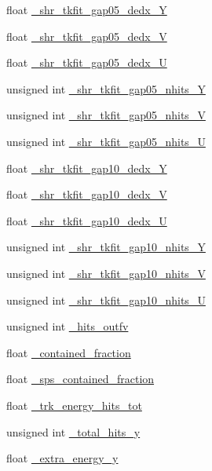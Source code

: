 \begin{DoxyCompactItemize}
\item 
float \hyperlink{classselection_1_1CC0piNpSelection_a82a0f0efca7cceee176b7058001073a6}{\+\_\+shr\+\_\+tkfit\+\_\+gap05\+\_\+dedx\+\_\+Y}
\item 
float \hyperlink{classselection_1_1CC0piNpSelection_a711b325a6f6cb77db530eb21e1c99fc0}{\+\_\+shr\+\_\+tkfit\+\_\+gap05\+\_\+dedx\+\_\+V}
\item 
float \hyperlink{classselection_1_1CC0piNpSelection_ad0504ef7cf7c8fa5a0059fbaedd6861b}{\+\_\+shr\+\_\+tkfit\+\_\+gap05\+\_\+dedx\+\_\+U}
\item 
unsigned int \hyperlink{classselection_1_1CC0piNpSelection_a91054bcbcb38dd0684fe810167c7146f}{\+\_\+shr\+\_\+tkfit\+\_\+gap05\+\_\+nhits\+\_\+Y}
\item 
unsigned int \hyperlink{classselection_1_1CC0piNpSelection_a515d1b21ecb57c0177501823b5ec2568}{\+\_\+shr\+\_\+tkfit\+\_\+gap05\+\_\+nhits\+\_\+V}
\item 
unsigned int \hyperlink{classselection_1_1CC0piNpSelection_a06b5781f09cf3c5129efad982fa3c210}{\+\_\+shr\+\_\+tkfit\+\_\+gap05\+\_\+nhits\+\_\+U}
\item 
float \hyperlink{classselection_1_1CC0piNpSelection_ae4ccdcc53f1b3e72cb360af8af316eb8}{\+\_\+shr\+\_\+tkfit\+\_\+gap10\+\_\+dedx\+\_\+Y}
\item 
float \hyperlink{classselection_1_1CC0piNpSelection_adf21374d01634ceeb71cdcb954c40b98}{\+\_\+shr\+\_\+tkfit\+\_\+gap10\+\_\+dedx\+\_\+V}
\item 
float \hyperlink{classselection_1_1CC0piNpSelection_a3b32a837b2388327cee3eb07ad25a557}{\+\_\+shr\+\_\+tkfit\+\_\+gap10\+\_\+dedx\+\_\+U}
\item 
unsigned int \hyperlink{classselection_1_1CC0piNpSelection_ac4f7286273aa34122aa80e6dbf34b9f7}{\+\_\+shr\+\_\+tkfit\+\_\+gap10\+\_\+nhits\+\_\+Y}
\item 
unsigned int \hyperlink{classselection_1_1CC0piNpSelection_a1dac5397a17c360ce67831fa3ed8aed5}{\+\_\+shr\+\_\+tkfit\+\_\+gap10\+\_\+nhits\+\_\+V}
\item 
unsigned int \hyperlink{classselection_1_1CC0piNpSelection_ae639e53ae1ea9c2bed506ca5d2e5c486}{\+\_\+shr\+\_\+tkfit\+\_\+gap10\+\_\+nhits\+\_\+U}
\item 
unsigned int \hyperlink{classselection_1_1CC0piNpSelection_ac39ec79d190fb925f8d20b03cbeb0605}{\+\_\+hits\+\_\+outfv}
\item 
float \hyperlink{classselection_1_1CC0piNpSelection_a8e7933222bce1424aee24bae8dcf4864}{\+\_\+contained\+\_\+fraction}
\item 
float \hyperlink{classselection_1_1CC0piNpSelection_ac425fa284847d7cae95f21367ed4889e}{\+\_\+sps\+\_\+contained\+\_\+fraction}
\item 
float \hyperlink{classselection_1_1CC0piNpSelection_a82a48c6128c34252642d237b98f1b66a}{\+\_\+trk\+\_\+energy\+\_\+hits\+\_\+tot}
\item 
unsigned int \hyperlink{classselection_1_1CC0piNpSelection_a819d1d973e74bcd2ad82aa01ea24ac37}{\+\_\+total\+\_\+hits\+\_\+y}
\item 
float \hyperlink{classselection_1_1CC0piNpSelection_a2e386c361ecc27d22ff2642e80a629e4}{\+\_\+extra\+\_\+energy\+\_\+y}
\end{DoxyCompactItemize}
